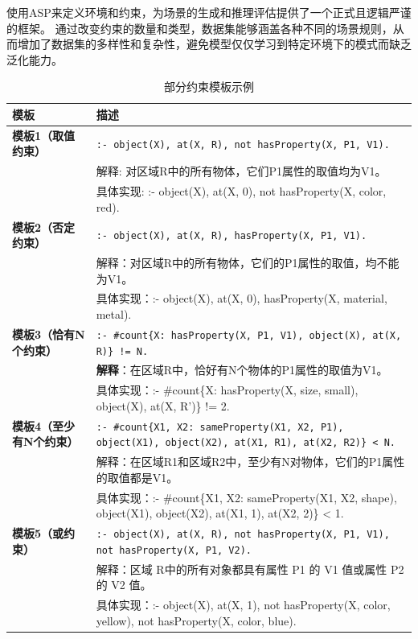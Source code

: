 使用ASP来定义环境和约束，为场景的生成和推理评估提供了一个正式且逻辑严谨的框架。
通过改变约束的数量和类型，数据集能够涵盖各种不同的场景规则，从而增加了数据集的多样性和复杂性，避免模型仅仅学习到特定环境下的模式而缺乏泛化能力。
\begin{table}[!h]
    \centering
    \renewcommand{\arraystretch}{1.0}
    \begin{tabular}{|p{3cm}|p{12cm}|}
        \hline
        \textbf{模板} & \textbf{描述} \\
        \hline
        \textbf{模板1（取值约束）} & 
        \texttt{:- object(X), at(X, R), not hasProperty(X, P1, V1).} \\ 
        & 解释: 对区域R中的所有物体，它们P1属性的取值均为V1。 \\ 
        & 具体实现: :- object(X), at(X, 0), not hasProperty(X, color, red). \\
        \hline
        
        \textbf{模板2（否定约束）} & 
        \texttt{:- object(X), at(X, R), hasProperty(X, P1, V1).} \\ 
        & 解释：对区域R中的所有物体，它们的P1属性的取值，均不能为V1。 \\ 
        & 具体实现：:- object(X), at(X, 0), hasProperty(X, material, metal). \\
        \hline
        
        \textbf{模板3（恰有N个约束）} & 
        \texttt{:- \#count\{X: hasProperty(X, P1, V1), object(X), at(X, R)\} != N.} \\ 
        & \textbf{解释}：在区域R中，恰好有N个物体的P1属性的取值为V1。 \\ 
        & 具体实现：:- \#count\{X: hasProperty(X, size, small), object(X), at(X, R')\} != 2. \\
        \hline
        
        \textbf{模板4（至少有N个约束）} & 
        \texttt{:- \#count\{X1, X2: sameProperty(X1, X2, P1), object(X1), object(X2), at(X1, R1), at(X2, R2)\} < N.} \\ 
        & 解释：在区域R1和区域R2中，至少有N对物体，它们的P1属性的取值都是V1。 \\ 
        & 具体实现：:- \#count\{X1, X2: sameProperty(X1, X2, shape), object(X1), object(X2), at(X1, 1), at(X2, 2)\} < 1. \\
        \hline
        
        \textbf{模板5（或约束）} & 
        \texttt{:- object(X), at(X, R), not hasProperty(X, P1, V1), not hasProperty(X, P1, V2).} \\ 
        & 解释：区域 R中的所有对象都具有属性 P1 的 V1 值或属性 P2 的 V2 值。 \\ 
        & 具体实现：:- object(X), at(X, 1), not hasProperty(X, color, yellow), not hasProperty(X, color, blue). \\
        \hline
    \end{tabular}
    \caption{部分约束模板示例}
    \label{tab:asp_templates}
\end{table}
